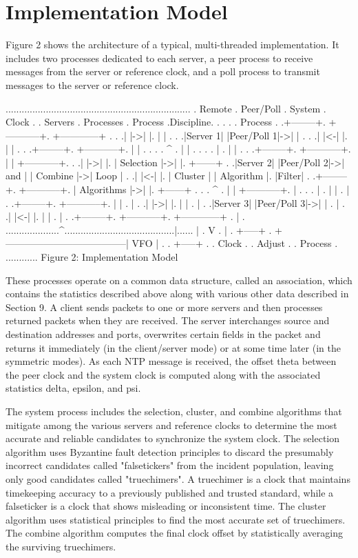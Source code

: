 \chapter{Implementation Model}

Figure 2 shows the architecture of a typical, multi-threaded
implementation. It includes two processes dedicated to each server,
a peer process to receive messages from the server or reference
clock, and a poll process to transmit messages to the server or
reference clock.

.....................................................................
. Remote . Peer/Poll . System . Clock .
. Servers . Processes . Process .Discipline.
. . . . Process .
.+--------+. +-----------+. +------------+ . .
.| |->| |. | | . .
.|Server 1| |Peer/Poll 1|->| | . .
.| |<-| |. | | . .
.+--------+. +-----------+. | | . .
. . ^ . | | . .
. . | . | | . .
.+--------+. +-----------+. | | +-----------+. .
.| |->| |. | Selection |->| |. +------+ .
.|Server 2| |Peer/Poll 2|->| and | | Combine |->| Loop | .
.| |<-| |. | Cluster | | Algorithm |. |Filter| .
.+--------+. +-----------+. | Algorithms |->| |. +------+ .
. . ^ . | | +-----------+. | .
. . | . | | . | .
.+--------+. +-----------+. | | . | .
.| |->| |. | | . | .
.|Server 3| |Peer/Poll 3|->| | . | .
.| |<-| |. | | . | .
.+--------+. +-----------+. +------------+ . | .
....................^.........................................|......
| . V .
| . +-----+ .
+--------------------------------------| VFO | .
. +-----+ .
. Clock .
. Adjust .
. Process .
............
Figure 2: Implementation Model

These processes operate on a common data structure, called an
association, which contains the statistics described above along with
various other data described in Section 9. A client sends packets to
one or more servers and then processes returned packets when they are
received. The server interchanges source and destination addresses
and ports, overwrites certain fields in the packet and returns it
immediately (in the client/server mode) or at some time later (in the
symmetric modes). As each NTP message is received, the offset theta
between the peer clock and the system clock is computed along with
the associated statistics delta, epsilon, and psi.

The system process includes the selection, cluster, and combine
algorithms that mitigate among the various servers and reference
clocks to determine the most accurate and reliable candidates to
synchronize the system clock. The selection algorithm uses Byzantine
fault detection principles to discard the presumably incorrect
candidates called "falsetickers" from the incident population,
leaving only good candidates called "truechimers". A truechimer is a
clock that maintains timekeeping accuracy to a previously published
and trusted standard, while a falseticker is a clock that shows
misleading or inconsistent time. The cluster algorithm uses
statistical principles to find the most accurate set of truechimers.
The combine algorithm computes the final clock offset by
statistically averaging the surviving truechimers.

